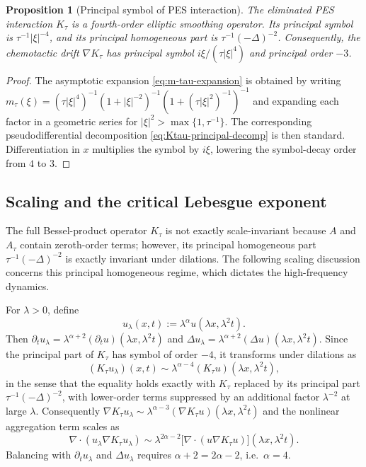 \documentclass[11pt,reqno]{amsart}
\newtheorem{proposition}[theorem]{Proposition}
\theoremstyle{definition}
\theoremstyle{remark}
\newcommand{\Div}{\nabla\!\cdot}
\begin{document}
\begin{proposition}[Principal symbol of PES interaction]\label{prop:Ktau-principal-symbol}
The eliminated PES interaction $K_\tau$ is a fourth-order elliptic smoothing operator. Its principal symbol is $\tau^{-1}|\xi|^{-4}$, and its principal homogeneous part is $\tau^{-1}(-\Delta)^{-2}$. Consequently, the chemotactic drift $\nabla K_\tau$ has principal symbol $i\xi/(\tau|\xi|^{4})$ and principal order $-3$.
\end{proposition}

\begin{proof}
The asymptotic expansion \eqref{eq:m-tau-expansion} is obtained by writing
$
        m_\tau(\xi)=(\tau|\xi|^{4})^{-1}(1+|\xi|^{-2})^{-1}(1+(\tau|\xi|^{2})^{-1})^{-1}
$
and expanding each factor in a geometric series for $|\xi|^{2}>\max\{1,\tau^{-1}\}$. The corresponding pseudodifferential decomposition \eqref{eq:Ktau-principal-decomp} is then standard. Differentiation in $x$ multiplies the symbol by $i\xi$, lowering the symbol-decay order from $4$ to $3$.
\end{proof}

\subsection{Scaling and the critical Lebesgue exponent}
\label{subsec:PES-scaling}

The full Bessel-product operator $K_\tau$ is not exactly scale-invariant because $A$ and $A_\tau$ contain zeroth-order terms; however, its principal homogeneous part $\tau^{-1}(-\Delta)^{-2}$ is exactly invariant under dilations. The following scaling discussion concerns this principal homogeneous regime, which dictates the high-frequency dynamics.

For $\lambda>0$, define
\begin{equation}\label{eq:PES-scaling-def}
        u_\lambda(x,t):=\lambda^{\alpha}u(\lambda x,\lambda^{2}t).
\end{equation}
Then $\partial_t u_\lambda=\lambda^{\alpha+2}(\partial_t u)(\lambda x,\lambda^{2}t)$ and $\Delta u_\lambda=\lambda^{\alpha+2}(\Delta u)(\lambda x,\lambda^{2}t)$. Since the principal part of $K_\tau$ has symbol of order $-4$, it transforms under dilations as
\begin{equation}\label{eq:Ktau-scaling-principal}
        (K_\tau u_\lambda)(x,t)
        \sim\lambda^{\alpha-4}(K_\tau u)(\lambda x,\lambda^{2}t),
\end{equation}
in the sense that the equality holds exactly with $K_\tau$ replaced by its principal part $\tau^{-1}(-\Delta)^{-2}$, with lower-order terms suppressed by an additional factor $\lambda^{-2}$ at large $\lambda$. Consequently $\nabla K_\tau u_\lambda\sim\lambda^{\alpha-3}(\nabla K_\tau u)(\lambda x,\lambda^{2}t)$ and the nonlinear aggregation term scales as
\begin{equation}\label{eq:nonlinear-scaling}
        \Div(u_\lambda\nabla K_\tau u_\lambda)
        \sim\lambda^{2\alpha-2}\bigl[\Div(u\nabla K_\tau u)\bigr](\lambda x,\lambda^{2}t).
\end{equation}
Balancing with $\partial_t u_\lambda$ and $\Delta u_\lambda$ requires $\alpha+2=2\alpha-2$, i.e.\ $\alpha=4$.
\end{document}
